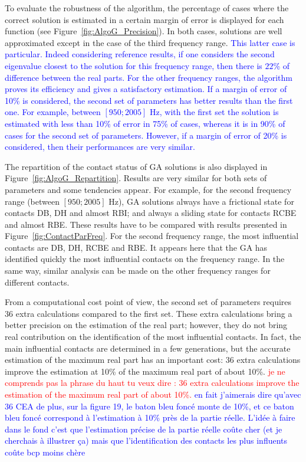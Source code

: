 \documentclass[final,1p]{elsarticle}
\newcommand{\tb}[1]{\textcolor{blue}{#1}}
\begin{document}
To evaluate the robustness of the algorithm, the percentage of cases where the correct solution is estimated in a certain margin of error is displayed for each function (see Figure~\ref{fig:AlgoG_Precision}). In both cases, solutions are well approximated except in the case of the third frequency range. \tb{This latter case is particular. Indeed considering reference results, if one considers the second eigenvalue closest to the solution for this frequency range, then there is $22$\% of difference between the real parts. For the other frequency ranges, the algorithm proves its efficiency and gives a satisfactory estimation. If a margin of error of 10\% is considered, the second set of parameters has better results than the first one. For example, between $[950;2005]$ Hz, with the first set the solution is estimated with less than 10\% of error in 75\% of cases, whereas it is in 90\% of cases for the second set of parameters. However, if a margin of error of 20\% is considered, then their performances are very similar.}

The repartition of the contact status of GA solutions is also displayed in Figure~\ref{fig:AlgoG_Repartition}. Results are very similar for both sets of parameters and some tendencies appear. For example, for the second frequency range (between $[950;2005]$ Hz), GA solutions always have a frictional state for contacts DB, DH and almost RBI; and always a sliding state for contacts RCBE and almost RBE. These results have to be compared with results presented in Figure~\ref{fig:ContactParFreq}. For the second frequency range, the most influential contacts are DB, DH, RCBE and RBE. It appears here that the GA has identified quickly the most influential contacts on the frequency range. In the same way, similar analysis can be made on the other frequency ranges for different contacts.

From a computational cost point of view, the second set of parameters requires $36$ extra calculations compared to the first set. These extra calculations bring a better precision on the estimation of the real part; however, they do not bring real contribution on the identification of the most influential contacts. In fact, the main influential contacts are determined in a few generations, but the accurate estimation of the maximum real part has an important cost: $36$ extra calculations improve the estimation at 10\% of the maximum real part of about 10\%.
\textcolor{red}{ je ne comprends pas la phrase du haut tu veux dire : $36$ extra calculations improve the estimation of the maximum real part of about 10\%.}
\tb{en fait j'aimerais dire qu'avec 36 CEA de plus, sur la figure 19, le baton bleu foncé monte de 10\%, et ce baton bleu foncé correspond à l'estimation à 10\% près de la partie réelle. L'idée à faire dans le fond c'est que l'estimation précise de la partie réelle coûte cher (et je cherchais à illustrer ça) mais que l'identification des contacts les plus influents coûte bcp moins chère }
\end{document}

